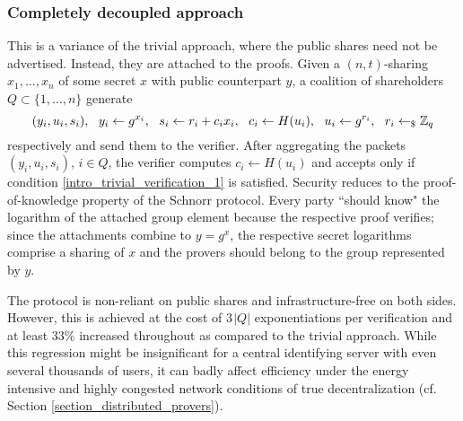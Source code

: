 \documentclass[10pt, psamsfonts, reqno]{amsart}
\theoremstyle{definition}
\theoremstyle{remark}
\numberwithin{equation}{section}
\begin{document}
\subsubsection{Completely decoupled approach}\label{section_decoupled_commitment}

This is a variance of the trivial approach,
where the public shares
need not be advertised.
Instead, they are attached to the proofs.
Given a $(n, t)$-sharing
$x_1, \dots, x_n$ of some secret $x$
with public counterpart $y$,
a coalition of shareholders
$Q \subset \{1, \dots, n\}$
generate
\vspace{5pt}
\begin{equation*}
(y_i, u_i, s_i),
\ \ y_i \leftarrow g ^ {x_i},
\ \ s_i \leftarrow r_i + c_i x_i,
\ \ c_i \leftarrow H(u_i),
\ \ u_i \leftarrow g ^ {r_i},
\ \ r_i \leftarrow_\$ \mathbb{Z}_q
\vspace{5pt}
\end{equation*}
respectively
and send them to the verifier.
After aggregating the packets
$(y_i, u_i, s_i)$, $i \in Q$,
the verifier computes $c_i \leftarrow H(u_i)$
and accepts only if condition
\eqref{intro_trivial_verification_1}
is satisfied.
Security reduces to the proof-of-knowledge
property of the Schnorr protocol.
Every party ``should know"
the logarithm of the attached group element
because the respective proof verifies;
since the attachments combine to $y = g ^ x$,
the respective secret logarithms comprise a sharing of
$x$ and the provers should belong to the group
represented by $y$.

The protocol is non-reliant on public shares and
infrastructure-free on both sides.
However, this is achieved at the cost of
$3\hspace{1pt}|Q|$ exponentiations per verification
and at least $33\%$ increased throughout
as compared to the trivial approach.
While this regression might be insignificant
for a central identifying server
with even several thousands of users,
it can badly affect efficiency under
the energy intensive and
highly congested network conditions
of true decentralization
(cf. Section \ref{section_distributed_provers}).
\end{document}
